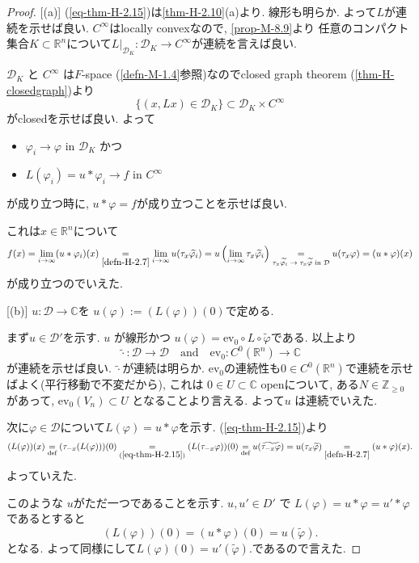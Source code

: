 \documentclass[dvipdfmx,a4paper,11pt]{article} %
\theoremstyle{definition}
\theoremstyle{remark}
\numberwithin{equation}{section}
\newcommand{\R}{\mathbb{R}}
\newcommand{\Z}{\mathbb{Z}}
\newcommand{\C}{\mathbb{C}}
\begin{document}
\begin{proof}

[(a)]
(\ref{eq-thm-H-2.15})は\ref{thm-H-2.10}(a)より. 
線形も明らか.  よって\(L\)が連続を示せば良い.
$C^\infty$はlocally convexなので, \ref{prop-M-8.9}より
任意のコンパクト集合$K \subset \R^n$について$L|_{\mathcal{D}_{K} } : \mathcal{D}_{K} \to C^\infty$が連続を言えば良い.

\(\mathcal{D}_{K}\) と \(C^\infty\) は\(F\)-space (\ref{defn-M-1.4}参照)なのでclosed graph theorem (\ref{thm-H-closedgraph})より
$$
\{ (x, L x) \in \mathcal{D}_{K}\} \subset \mathcal{D}_{K} \times C^\infty
$$
がclosedを示せば良い. 
よって
\begin{itemize}
\item \(\varphi_i \to \varphi\) in \(\mathcal{D}_{K}\) かつ
\item \(L(\varphi_i) = u \ast  \varphi_i \to f  \) in  \(C^\infty\)
\end{itemize}
が成り立つ時に,  \(u \ast \varphi = f\)が成り立つことを示せば良い. 

これは$x \in \R^n$について
\[
f(x) 
= \lim_{i \to \infty} (u \ast \varphi_i)(x)
\underset{\ref{defn-H-2.7}}{=} \lim_{i \to \infty} u(\tau_x \widetilde{\varphi_i})
= u \left( \lim_{i \to \infty} \tau_x \widetilde{\varphi_i} \right)
\underset{\text{$\tau_x \widetilde{\varphi_i} \to \tau_x \widetilde{\varphi}$ in $\mathcal{D}$}}{=} u(\tau_x \varphi) 
= (u \ast \varphi)(x) 
\]
が成り立つのでいえた.

[(b)]
 \(u :\mathcal{D} \to \C\)を \(u(\varphi) := (L(\varphi))(0)\)で定める. 

まず\(u \in \mathcal{D}'\)を示す. 
\(u\) が線形かつ
\(u(\varphi) = \mathrm{ev}_0 \circ L \circ \widetilde{\varphi}\)である.
以上より
\[
\widetilde{\cdot} :\mathcal{D} \to \mathcal{D}
\quad
\text{and}
\quad
\mathrm{ev}_0: C^0(\R^n) \to \C
\]
が連続を示せば良い. 
 \(\widetilde{\cdot}\)が連続は明らか.
 $\mathrm{ev}_0$の連続性も$0 \in C^0(\R^n)$で連続を示せばよく(平行移動で不変だから), これは
  \(0 \in U \subset \C\) openについて, ある\(N \in \Z_{\ge 0}\) があって, 
  \(\mathrm{ev}_0(V_n) \subset U\) となることより言える. 
  よって\(u\) は連続でいえた.

次に\( \varphi \in \mathcal{D}\)について\(L(\varphi) = u \ast \varphi\)を示す.
(\ref{eq-thm-H-2.15})より
\begin{equation}
\label{eq2-thm-H-2.15}
(L(\varphi))(x) 
\underset{\text{def}}{=} (\tau_{-x}(L(\varphi)))(0)
\underset{(\ref{eq-thm-H-2.15})}{=}  (L(\tau_{-x} \varphi))(0) 
\underset{\text{def}}{=}  u(\widetilde{\tau_{-x}\varphi})
= u(\tau_x \widetilde{\varphi}) 
\underset{\ref{defn-H-2.7}}{=}  (u \ast \varphi)(x).
\end{equation}
よっていえた.

このような \(u\)がただ一つであることを示す.
\(u, u' \in D'\) で \(L(\varphi) = u \ast \varphi = u' \ast\varphi\)であるとすると
\[
(L(\varphi))(0) = (u \ast \varphi)(0) = u(\widetilde{\varphi}).
\]
となる. よって同様にして\(L(\varphi)(0) = u'(\widetilde{\varphi}).\)であるので言えた. 
\end{proof}
\end{document}
